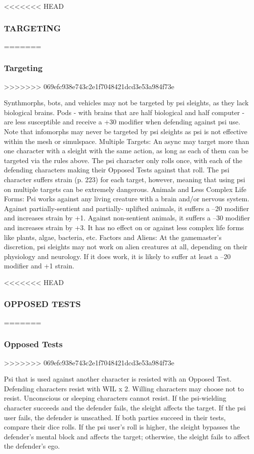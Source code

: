 <<<<<<< HEAD
\subsubsection{TARGETING}
=======
\subsubsection{Targeting}
>>>>>>> 069efc938e743c2e1f7048421dcd3e53a984f73e

Synthmorphs, bots, and vehicles may not be targeted
by psi sleights, as they lack biological brains. Pods
- with brains that are half biological and half computer -
are less susceptible and receive a +30 modifier
when defending against psi use. Note that infomorphs
may never be targeted by psi sleights as psi is not effective
within the mesh or simulspace.
Multiple Targets: An async may target more than
one character with a sleight with the same action, as
long as each of them can be targeted via the rules
above. The psi character only rolls once, with each of
the defending characters making their Opposed Tests
against that roll. The psi character suffers strain (p.
223) for each target, however, meaning that using psi
on multiple targets can be extremely dangerous.
Animals and Less Complex Life Forms: Psi works
against any living creature with a brain and/or
nervous system. Against partially-sentient and partially-
uplifted animals, it suffers a –20 modifier and
increases strain by +1. Against non-sentient animals,
it suffers a –30 modifier and increases strain by +3. It
has no effect on or against less complex life forms like
plants, algae, bacteria, etc.
Factors and Aliens: At the gamemaster’s discretion,
psi sleights may not work on alien creatures at all, depending
on their physiology and neurology. If it does
work, it is likely to suffer at least a –20 modifier and
+1 strain.

<<<<<<< HEAD
\subsubsection{OPPOSED TESTS}
=======
\subsubsection{Opposed Tests}
>>>>>>> 069efc938e743c2e1f7048421dcd3e53a984f73e

Psi that is used against another character is resisted
with an Opposed Test. Defending characters resist with
WIL x 2. Willing characters may choose not to resist.
Unconscious or sleeping characters cannot resist.
If the psi-wielding character succeeds and the defender
fails, the sleight affects the target. If the psi user
fails, the defender is unscathed. If both parties succeed
in their tests, compare their dice rolls. If the psi
user’s roll is higher, the sleight bypasses the defender’s
mental block and affects the target; otherwise, the
sleight fails to affect the defender’s ego.

